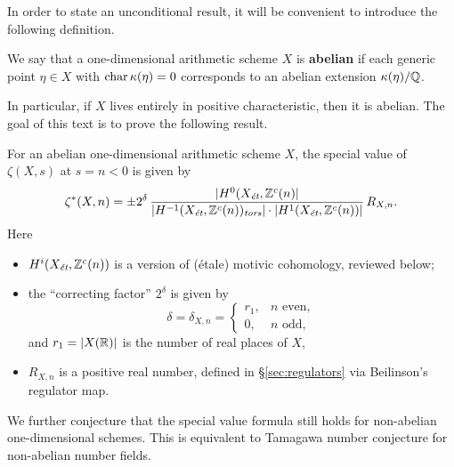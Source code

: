\documentclass[draft]{article}
\numberwithin{equation}{section}
\begin{document}
\vspace{1em}

In order to state an unconditional result, it will be convenient to introduce
the following definition.

\begin{definition}
  We say that a one-dimensional arithmetic scheme $X$ is \textbf{abelian} if
  each generic point $\eta \in X$ with $\fchar \kappa (\eta) = 0$ corresponds to
  an abelian extension $\kappa (\eta)/\QQ$.
\end{definition}

In particular, if $X$ lives entirely in positive characteristic, then it is
abelian. The goal of this text is to prove the following result.

\begin{theorem}
  \label{main-theorem}
  For an abelian one-dimensional arithmetic scheme $X$, the special value of
  $\zeta (X,s)$ at $s = n < 0$ is given by
  \begin{equation}
    \label{eqn:special-value-formula}
    \zeta^* (X,n) =
    \pm 2^\delta\,\frac{|H^0 (X_\et, \ZZ^c (n)|}{|H^{-1} (X_\et, \ZZ^c (n))_\tors| \cdot |H^1 (X_\et, \ZZ^c (n))|}\,R_{X,n}.
  \end{equation}
  Here
  \begin{itemize}
  \item $H^i (X_\et, \ZZ^c (n))$ is a version of (\'{e}tale) motivic cohomology,
    reviewed below;

  \item the ``correcting factor'' $2^\delta$ is given by
    \begin{equation}
      \label{eqn:delta}
      \delta = \delta_{X,n} =
      \begin{cases}
        r_1, & n \text{ even}, \\
        0, & n \text{ odd},
      \end{cases}
    \end{equation}
    and $r_1 = |X (\RR)|$ is the number of real places of $X$,

  \item $R_{X,n}$ is a positive real number, defined in \S\ref{sec:regulators}
    via Beilinson's regulator map.
  \end{itemize}
\end{theorem}

We further conjecture that the special value formula still holds for non-abelian
one-dimensional schemes. This is equivalent to Tamagawa number conjecture for
non-abelian number fields.
\end{document}
